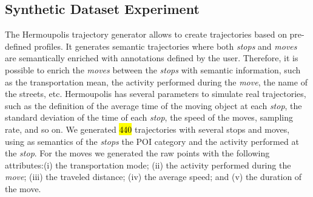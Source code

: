 \documentclass[12pt]{article}
\begin{document}


\subsection{Synthetic Dataset Experiment}\label{sec:hermoupolis}
The Hermoupolis trajectory generator \citep{Pelekis-Hermoupolis} allows to create trajectories based on pre-defined profiles. It generates semantic trajectories where both \emph{stops} and \emph{moves} are semantically enriched with annotations defined by the user. Therefore, it is possible to enrich the \emph{moves} between the \emph{stops} with semantic information, such as the transportation mean, the activity performed during the \emph{move}, the name of the streets, etc. Hermoupolis has several parameters to simulate real trajectories, such as the definition of the average time of the moving object at each \emph{stop}, the standard deviation of the time of each \emph{stop}, the speed of the moves, sampling rate, and so on. We generated \hl{440} trajectories with several stops and moves, using as semantics of the \emph{stops} the POI category and the activity performed at the \emph{stop}. For the moves we generated the raw points with the following attributes:(i) the transportation mode; (ii) the activity performed during the \emph{move}; (iii) the traveled distance; (iv) the average speed; and (v) the duration of the move.
\end{document}
